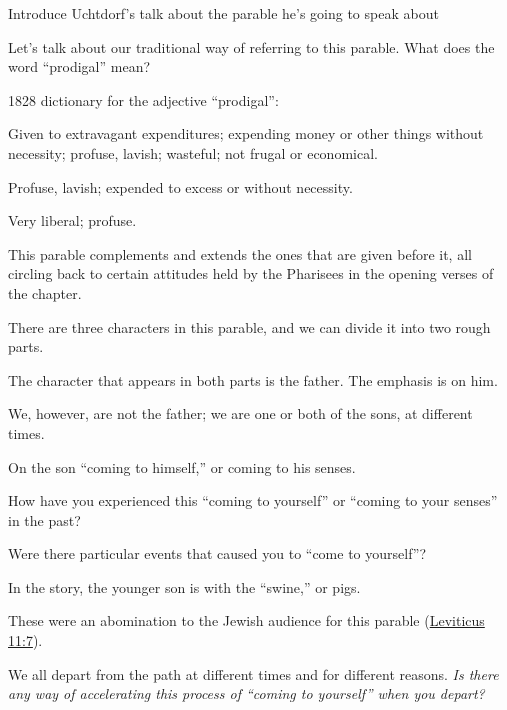 		\begin{compactitem}
		
			\item Introduce Uchtdorf's talk about the parable he's going to speak about
			
			\item Let's talk about our traditional way of referring to this parable. What does the word ``prodigal'' mean?
				\begin{compactitem}
					\item 1828 dictionary for the adjective ``prodigal'':
						\begin{compactitem}
							\item[1] Given to extravagant expenditures; expending money or other things without necessity; profuse, lavish; wasteful; not frugal or economical.
							\item[2] Profuse, lavish; expended to excess or without necessity.
							\item[3] Very liberal; profuse.
						\end{compactitem}
					\item This parable complements and extends the ones that are given before it, all circling back to certain attitudes held by the Pharisees in the opening verses of the chapter.
				\end{compactitem}
				
			\item There are three characters in this parable, and we can divide it into two rough parts.
				\begin{compactitem}
					\item The character that appears in both parts is the father. The emphasis is on him.
					\item We, however, are not the father; we are one or both of the sons, at different times.
				\end{compactitem}
				
			\item On the son ``coming to himself,'' or coming to his senses.
				\begin{compactitem}
					\item How have you experienced this ``coming to yourself'' or ``coming to your senses'' in the past?
					\item Were there particular events that caused you to ``come to yourself''?
						\begin{compactitem}
							\item In the story, the younger son is with the ``swine,'' or pigs.
							\item These were an abomination to the Jewish audience for this parable (\hyperref[LEVITICUS-11-7]{Leviticus 11:7}).
						\end{compactitem}
					\item We all depart from the path at different times and for different reasons. \textit{Is there any way of accelerating this process of ``coming to yourself'' when you depart?}
				\end{compactitem}
		

\end{compactitem}
